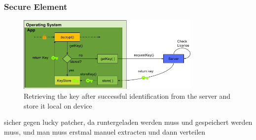 \subsubsection{Secure Element} \label{section:counter-replace-encryption-key-online}
\begin{figure}[h]
    \centering
    \includegraphics[width=0.8\textwidth]{data/encryptionKeyServer.png}
    \caption{Retrieving the key after successful identification from the server and store it local on device}
    \label{fig:encryptionKeyServer}
\end{figure}

sicher gegen lucky patcher, da runtergeladen werden muss und gespeichert werden muss, und man muss erstmal manuel extracten und dann verteilen
